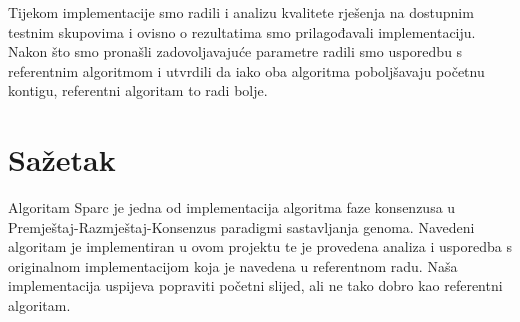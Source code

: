 \documentclass[times, utf8, seminar, numeric]{fer}
\begin{document}
Tijekom implementacije smo radili i analizu kvalitete rješenja na dostupnim testnim skupovima i ovisno o rezultatima smo prilagođavali implementaciju. Nakon što smo pronašli zadovoljavajuće parametre radili smo usporedbu s referentnim algoritmom i utvrdili da iako oba algoritma poboljšavaju početnu kontigu, referentni algoritam to radi bolje.



\nocite{*}


\chapter{Sažetak}
Algoritam Sparc je jedna od implementacija algoritma faze konsenzusa u Premještaj-Razmještaj-Konsenzus paradigmi sastavljanja genoma. Navedeni algoritam je implementiran u ovom projektu te je provedena analiza i usporedba s originalnom implementacijom koja je navedena u referentnom radu. Naša implementacija uspijeva popraviti početni slijed, ali ne tako dobro kao referentni algoritam.
\end{document}
